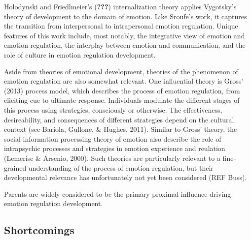 \documentclass[
  english,
  man]{apa6}
\begin{document}
Holodynski and Friedlmeier's ({\textbf{???}}) internalization theory applies Vygotsky's theory of development to the domain of emotion. Like Sroufe's work, it captures the transition from interpersonal to intrapersonal emotion regulation. Unique features of this work include, most notably, the integrative view of emotion and emotion regulation, the interplay between emotion and communication, and the role of culture in emotion regulation development.

Aside from theories of emotional development, theories of the phenomenon of emotion regulation are also somewhat relevant. One influential theory is Gross' (2013) process model, which describes the process of emotion regulation, from eliciting cue to ultimate response. Individuals modulate the different stages of this process using strategies, consciously or otherwise. The effectiveness, desireability, and consequences of different strategies depend on the cultural context (see Bariola, Gullone, \& Hughes, 2011). Similar to Gross' theory, the social information processing theory of emotion also describe the role of intrapsychic processes and strategies in emotion experience and reulation (Lemerise \& Arsenio, 2000). Such theories are particularly relevant to a fine-grained understanding of the process of emotion regulation, but their developmental relevance has unfortunately not yet been considered (REF Buss).

Parents are widely considered to be the primary proximal influence driving emotion regulation development.

\hypertarget{shortcomings}{%
\subsection{Shortcomings}\label{shortcomings}}
\end{document}
